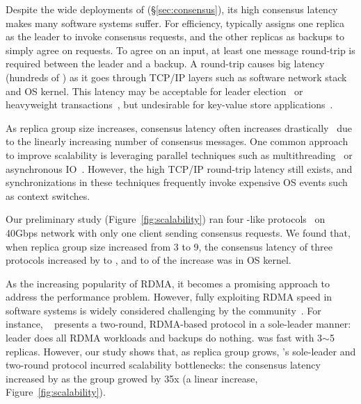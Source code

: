 Despite the wide deployments of \paxos (\S\ref{sec:consensus}), its high 
consensus latency makes many software systems suffer. For efficiency, \paxos 
typically assigns one replica as the leader to invoke consensus requests, and 
the other replicas as backups to simply agree on requests. To agree on an 
input, at least one message round-trip is required between the leader and a 
backup. A round-trip causes big latency (hundreds of \us) as it goes through 
TCP/IP layers such as software network stack and OS kernel. This latency may 
be acceptable for leader election~\cite{chubby:osdi,zookeeper} or heavyweight 
transactions~\cite{crane:sosp15,eve:osdi12}, but undesirable for
key-value store applications~\cite{redis,memcached}.

As replica group size increases, \paxos consensus latency often increases
drastically~\cite{scatter:sosp11} due to the linearly increasing number of 
consensus messages. One common approach to improve \paxos scalability is 
leveraging parallel techniques such as multithreading~\cite{zookeeper, 
spaxos:srds12} or asynchronous IO~\cite{crane:sosp15, libpaxos}. However, the 
high TCP/IP round-trip latency still exists, and synchronizations in these 
techniques frequently invoke expensive OS events such as context switches.

Our preliminary study (Figure~\ref{fig:scalability}) ran four \paxos-like 
protocols~\cite{zookeeper, spaxos:srds12, crane:sosp15, libpaxos} on 40Gbps 
network with only one client sending consensus requests. We found that, when 
replica group size increased from 3 to 9, the consensus latency of three 
protocols increased by \tradlatencyincreaselow to 
\tradlatencyincreasehigh, and \systemcostlow to \systemcosthigh of the increase 
was in OS kernel.

As the increasing popularity of RDMA, it becomes a promising 
approach to address the \paxos performance problem. However, fully exploiting 
RDMA speed in software systems is widely considered challenging by 
the community~\cite{pilaf:usenix14,herd:sigcomm14,
farm:sosp15,dare:hpdc15}. For instance, \dare~\cite{dare:hpdc15} presents a
two-round, RDMA-based \paxos protocol in a sole-leader manner: leader does all 
RDMA workloads and backups do nothing. \dare was fast with 3$\sim$5 
replicas. However, our study shows that, as replica group grows, \dare's 
sole-leader and two-round protocol incurred scalability bottlenecks: the 
consensus latency increased by \darescalability as the group growed by 35x (a 
linear increase, Figure~\ref{fig:scalability}).


